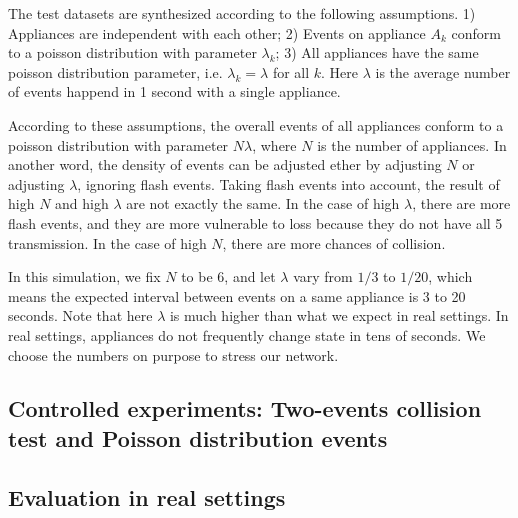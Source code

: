 The test datasets are synthesized according to the following assumptions. 1) Appliances are independent with each other; 2) Events on appliance $A_k$ conform to a poisson distribution with parameter $\lambda_k$; 3) All appliances have the same poisson distribution parameter, i.e. $\lambda_k = \lambda$ for all $k$. Here $\lambda$ is the average number of events happend in 1 second with a single appliance. 

According to these assumptions, the overall events of all appliances conform to a poisson distribution with parameter $N\lambda$, where $N$ is the number of appliances. In another word, the density of events can be adjusted ether by adjusting $N$ or adjusting $\lambda$, ignoring flash events. Taking flash events into account, the result of high $N$ and high $\lambda$ are not exactly the same. In the case of high $\lambda$, there are more flash events, and they are more vulnerable to loss because they do not have all 5 transmission. In the case of high $N$, there are more chances of collision. 

In this simulation, we fix $N$ to be 6, and let $\lambda$ vary from $1/3$ to $1/20$, which means the expected interval between events on a same appliance is 3 to 20 seconds. Note that here $\lambda$ is much higher than what we expect in real settings. In real settings, appliances do not frequently change state in tens of seconds. We choose the numbers on purpose to stress our network. 



\subsection{Controlled experiments: Two-events collision test and Poisson distribution events}

\subsection{Evaluation in real settings}


